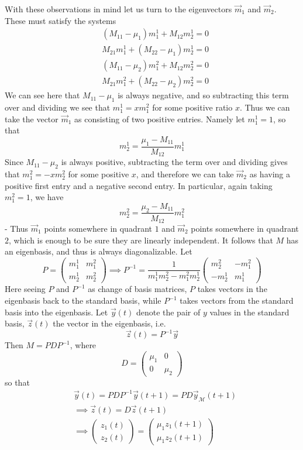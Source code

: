 \documentclass{article}
\theoremstyle{definition}
\theoremstyle{plain}
\theoremstyle{theorem}
\begin{document}
With these observations in mind let us turn to the eigenvectors $\vec{m}_1$ and $\vec{m}_2$. These must satisfy the systems
\begin{align}
	& (M_{11} - \mu_1)m^1_1 + M_{12}m^1_2 = 0  \label{e11}\\
	& M_{21}m^1_1 + (M_{22} - \mu_1)m^1_2 = 0 \label{e12}
\end{align}
\begin{align}
	& (M_{11} - \mu_2)m^2_1 + M_{12}m^2_2 = 0  \label{e21}\\
	& M_{21}m^2_1 + (M_{22} - \mu_2)m^2_2 = 0 \label{e22}
\end{align}
We can see here that $M_{11} - \mu_1$ is always negative, and so subtracting this term over and dividing we see that $m^1_1 = xm^2_1$ for some positive ratio $x$. Thus we can take the vector $\vec{m}_1$ as consisting of two positive entries. Namely let $m^1_1 = 1$, so that 
\[ m_2^1 = \frac{\mu_1-M_{11}}{M_{12}}m^1_1 \]
 Since $M_{11} - \mu_2$ is always positive, subtracting the term over and dividing gives that $m^2_1 = -xm^2_2$ for some positive $x$, and therefore we can take $\vec{m}_2$ as having a positive first entry and a negative second entry. In particular, again taking $m^2_1 = 1$, we have
\[ m^2_2 = \frac{\mu_2-M_{11}}{M_{12}}m^2_1 \]-  
  Thus $\vec{m}_1$ points somewhere in quadrant $1$ and $\vec{m}_2$ points somewhere in quadrant $2$, which is enough to be sure they are linearly independent. It follows that $M$ has an eigenbasis, and thus is always diagonalizable. Let 
  \[ P = \begin{pmatrix} m^1_1 & m^2_1 \\ m^1_2 & m^2_2 \end{pmatrix} \implies P^{-1} = \frac{1}{m^1_1m^2_2-m^2_1m^1_2} \begin{pmatrix} m^2_2 & -m^2_1 \\ -m^1_2 & m^1_1 \end{pmatrix} \]
Here seeing $P$ and $P^{-1}$ as change of basis matrices, $P$ takes vectors in the eigenbasis back to the standard basis, while $P^{-1}$ takes vectors from the standard basis into the eigenbasis. Let $\vec{y}(t)$ denote the pair of $y$ values in the standard basis, $\vec{z}(t)$ the vector in the eigenbasis, i.e. 
\[ \vec{z}(t) = P^{-1}\vec{y} \]
Then $M = PDP^{-1}$, where 
\[ D = \begin{pmatrix} \mu_1 & 0 \\ 0 & \mu_2 \end{pmatrix} \] so that
\begin{align}
	& \vec{y}(t) = PDP^{-1}\vec{y}(t+1) = PD\vec{y}_{\mathcal{M}}(t+1) \\
	&\implies \vec{z}(t) = D\vec{z}(t+1) \\
	&\implies \begin{pmatrix} z_1(t) \\ z_2(t) \end{pmatrix} = \begin{pmatrix} \mu_1z_1(t+1) \\ \mu_1z_2(t+1) \end{pmatrix}
\end{align}
\end{document}

